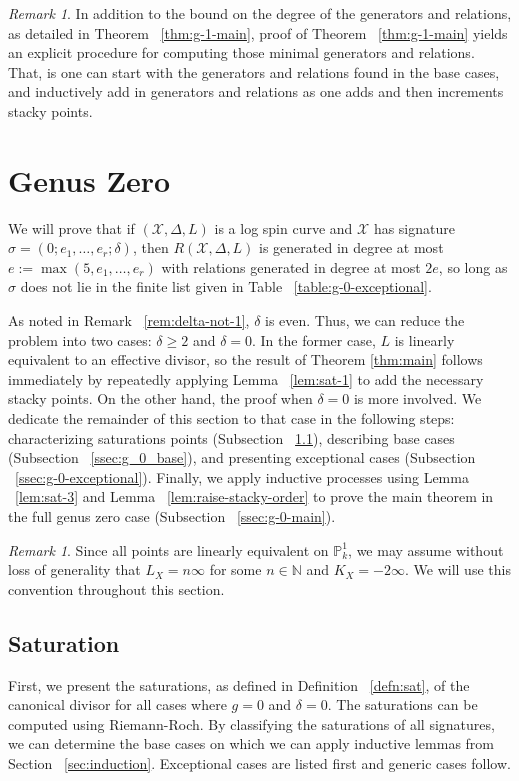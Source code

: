 \documentclass{amsart}
\theoremstyle{plain}
\theoremstyle{definition}
\theoremstyle{remark}
\newtheorem{rem}[thm]{Remark}
\numberwithin{equation}{section}
\newcommand\ssec{\subsection}
\newcommand\BN{{\mathbb N}}
\newcommand\BP{{\mathbb P}}
\newcommand\sx{\mathscr X}
\newcommand{\halfcan}{L}
\begin{document}
\begin{rem}
In addition to the bound on the degree of the generators and relations, as detailed in Theorem ~\ref{thm:g-1-main}, proof of Theorem ~\ref{thm:g-1-main} yields an explicit procedure for computing those minimal generators and relations. That, is one can start with the generators and relations found in the base cases, and inductively add in generators and relations as one adds and then increments stacky points.
\end{rem}


\section{Genus Zero}
\label{sec:g_0}
We will prove that if $(\sx, \Delta, \halfcan)$ is a log spin
curve and $\sx$ has signature $\sigma = (0; e_1, \ldots, e_r;
\delta)$, then $R(\sx, \Delta, L)$ is generated in degree at most
$e := \max(5, e_1, \ldots, e_r)$ with relations generated in degree
at most $2e$, so long as $\sigma$ does not lie in the finite list
given in Table ~\ref{table:g-0-exceptional}.

As noted in Remark ~\ref{rem:delta-not-1}, $\delta$ is even. Thus,
we can reduce the problem into two cases: $\delta \geq 2$ and
$\delta = 0$. In the former case, $\halfcan$ is linearly equivalent
to an effective divisor, so the result of Theorem \ref{thm:main}
follows immediately by repeatedly applying Lemma ~\ref{lem:sat-1}
to add the necessary stacky points. On the other hand, the proof
when $\delta = 0$ is more involved. We dedicate the remainder of
this section to that case in the following steps: characterizing
saturations points (Subsection ~\ref{ssec:g_0_saturation}),
describing base cases (Subsection ~\ref{ssec:g_0_base}), and
presenting exceptional cases (Subsection ~\ref{ssec:g-0-exceptional}).
Finally, we apply inductive processes using Lemma ~\ref{lem:sat-3}
and Lemma ~\ref{lem:raise-stacky-order} to prove the main theorem
in the full genus zero case (Subsection ~\ref{ssec:g-0-main}).
 
\begin{rem}
Since all points are linearly equivalent on $\BP^1_k$, we may
assume without loss of generality that $L_X = n \infty$ for some $n
\in \BN$ and $K_X = -2 \infty$. We will use this convention
throughout this section.
\end{rem}

\ssec{Saturation}
\label{ssec:g_0_saturation}
First, we present the saturations, as defined in Definition
~\ref{defn:sat}, of the canonical divisor for
all cases where $g = 0$ and $\delta = 0$. The saturations can be computed using Riemann-Roch.
By classifying the saturations of all signatures, we can determine
the base cases on which we can apply inductive lemmas from
Section ~\ref{sec:induction}. Exceptional cases are listed first
and generic cases follow.
\end{document}
